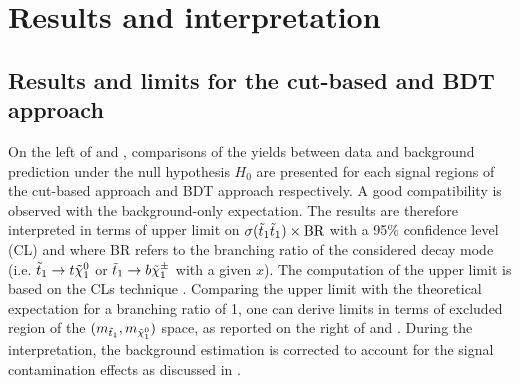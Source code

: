     \section{Results and interpretation \label{sec:analysis_results}}

    \subsection{Results and limits for the cut-based and BDT approach}

    On the left of  and , comparisons
    of the yields between data and background prediction under the null hypothesis $H_0$
    are presented for each signal regions of the cut-based approach and BDT approach respectively.
    A good compatibility is observed with the background-only expectation. The results
    are therefore interpreted in terms of upper limit on $\sigma(\tilde{t}_1\tilde{t}_1) \times \text{BR}$
    with a 95\% confidence level (CL) and where BR refers to the branching ratio of the
    considered decay mode (i.e. $\tilde{t}_1 \rightarrow t \tilde{\chi}_1^0$ or $\tilde{t}_1 \rightarrow
    b \tilde{\chi}_1^\pm$ with a given $x$). The computation of the upper limit is based on the
    CLs technique \cite{CLs}. Comparing the upper limit with the theoretical
    expectation for a branching ratio of 1, one can derive limits in terms of excluded
    region of the $(m_{\tilde{t}_1}, m_{\tilde{\chi}_1^0})$ space, as reported on the right
    of  and . During the interpretation, the
    background estimation is corrected to account for the signal contamination effects
    as discussed in .

